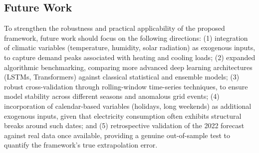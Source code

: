 \documentclass{ieeeaccess}
\begin{document}
\subsection{Future Work}
To strengthen the robustness and practical applicability of the proposed framework, future work should focus on the following directions: (1) integration of climatic variables (temperature, humidity, solar radiation) as exogenous inputs, to capture demand peaks associated with heating and cooling loads; (2) expanded algorithmic benchmarking, comparing more advanced deep learning architectures (LSTMs, Transformers) against classical statistical and ensemble models; (3) robust cross-validation through rolling-window time-series techniques, to ensure model stability across different seasons and anomalous grid events; (4) incorporation of calendar-based variables (holidays, long weekends) as additional exogenous inputs, given that electricity consumption often exhibits structural breaks around such dates; and (5) retrospective validation of the 2022 forecast against real data once available, providing a genuine out-of-sample test to quantify the framework's true extrapolation error.
\end{document}
